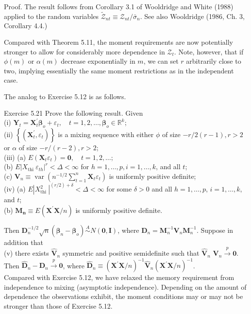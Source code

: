 \documentclass[10pt]{article}
\begin{document}
Proof. The result follows from Corollary 3.1 of Wooldridge and White (1988) applied to the random variables $\tilde{\mathcal{Z}}_{n t} \equiv \mathcal{Z}_{n t} / \bar{\sigma}_{n}$. See also Wooldridge (1986, Ch. 3, Corollary 4.4.)

Compared with Theorem 5.11, the moment requirements are now potentially stronger to allow for considerably more dependence in $\mathcal{Z}_{t}$. Note, however, that if $\phi(m)$ or $\alpha(m)$ decrease exponentially in $m$, we can set $r$ arbitrarily close to two, implying essentially the same moment restrictions as in the independent case.

The analog to Exercise 5.12 is as follows.

Exercise 5.21 Prove the following result. Given\\
(i) $\mathbf{Y}_{t}=\mathbf{X}_{t}^{\prime} \boldsymbol{\beta}_{o}+\varepsilon_{t}, \quad t=1,2, \ldots, \boldsymbol{\beta}_{o} \in \mathbb{R}^{k}$;\\
(ii) $\left\{\left(\mathbf{X}_{t}^{\prime}, \varepsilon_{t}\right)\right\}$ is a mixing sequence with either $\phi$ of size $-r / 2(r-1), r>2$ or $\alpha$ of size $-r /(r-2), r>2$;\\
(iii) (a) $E\left(\mathbf{X}_{t} \varepsilon_{t}\right)=\mathbf{0}, \quad t=1,2, \ldots$;\\
(b) $E\left|X_{\text {thi }} \varepsilon_{t h}\right|^{r}<\Delta<\infty$ for $h=1, \ldots, p, i=1, \ldots, k$, and all $t$;\\
(c) $\mathbf{V}_{n} \equiv \operatorname{var}\left(n^{-1 / 2} \sum_{t=1}^{n} \mathbf{X}_{t} \varepsilon_{t}\right)$ is uniformly positive definite;\\
(iv) (a) $E\left|X_{\text {thi }}^{2}\right|^{(r / 2)+\delta}<\Delta<\infty$ for some $\delta>0$ and all $h=1, \ldots, p$, $i=1, \ldots, k$, and $t$;\\
(b) $\mathbf{M}_{\boldsymbol{n}} \equiv E\left(\mathbf{X}^{\prime} \mathbf{X} / n\right)$ is uniformly positive definite.

Then $\mathbf{D}_{n}^{-1 / 2} \sqrt{n}\left(\hat{\boldsymbol{\beta}}_{n}-\boldsymbol{\beta}_{o}\right) \stackrel{A}{\sim} N(\mathbf{0}, \mathbf{I})$, where $\mathbf{D}_{n}=\mathbf{M}_{n}^{-1} \mathbf{V}_{n} \mathbf{M}_{n}^{-1}$. Suppose in addition that\\
(v) there exists $\hat{\mathbf{V}}_{n}$ symmetric and positive semidefinite such that $\hat{\mathbf{V}}_{n}$ $\mathbf{V}_{n} \xrightarrow{p} \mathbf{0}$.\\
Then $\hat{\mathbf{D}}_{n}-\mathbf{D}_{n} \xrightarrow{p} \mathbf{0}$, where $\hat{\mathbf{D}}_{n} \equiv\left(\mathbf{X}^{\prime} \mathbf{X} / n\right)^{-1} \hat{\mathbf{V}}_{n}\left(\mathbf{X}^{\prime} \mathbf{X} / n\right)^{-1}$.\\
Compared with Exercise 5.12, we have relaxed the memory requirement from independence to mixing (asymptotic independence). Depending on the amount of dependence the observations exhibit, the moment conditions may or may not be stronger than those of Exercise 5.12.
\end{document}
